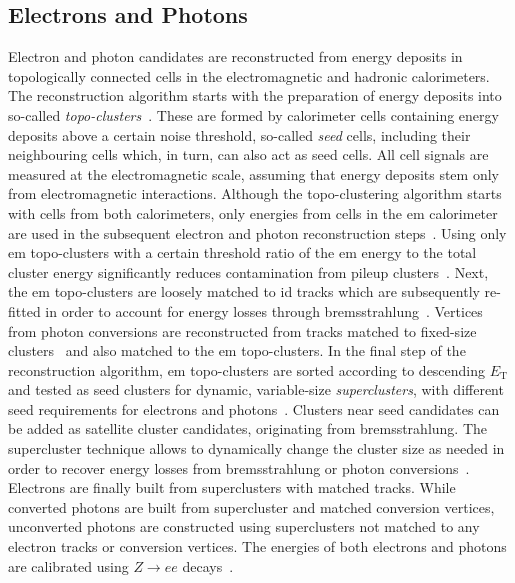 \subsection{Electrons and Photons}\label{sec:reco_electrons}

Electron and photon candidates are reconstructed from energy deposits in topologically connected cells in the electromagnetic and hadronic calorimeters. The reconstruction algorithm starts with the preparation of energy deposits into so-called \textit{topo-clusters}~\cite{PERF-2014-07}. These are formed by calorimeter cells containing energy deposits above a certain noise threshold, so-called \textit{seed} cells, including their neighbouring cells which, in turn, can also act as seed cells. All cell signals are measured at the electromagnetic scale, assuming that energy deposits stem only from electromagnetic interactions. Although the topo-clustering algorithm starts with cells from both calorimeters, only energies from cells in the \gls{em} calorimeter are used in the subsequent electron and photon reconstruction steps~\cite{EGAM-2018-01}. Using only \gls{em} topo-clusters with a certain threshold ratio of the \gls{em} energy to the total cluster energy significantly reduces contamination from pileup clusters~\cite{EGAM-2018-01}. Next, the \gls{em} topo-clusters are loosely matched to \gls{id} tracks which are subsequently re-fitted in order to account for energy losses through bremsstrahlung~\cite{EGAM-2018-01}. Vertices from photon conversions are reconstructed from tracks matched to fixed-size clusters~\cite{PERF-2017-02} and also matched to the \gls{em} topo-clusters. In the final step of the reconstruction algorithm, \gls{em} topo-clusters are sorted according to descending $E_{\mathrm{T}}$ and tested as seed clusters for dynamic, variable-size \textit{superclusters}, with different seed requirements for electrons and photons~\cite{EGAM-2018-01}. Clusters near seed candidates can be added as satellite cluster candidates, originating \eg from bremsstrahlung. The supercluster technique allows to dynamically change the cluster size as needed in order to recover energy losses from bremsstrahlung or photon conversions~\cite{EGAM-2018-01}. Electrons are finally built from superclusters with matched tracks. While converted photons are built from supercluster and matched conversion vertices, unconverted photons are constructed using superclusters not matched to any electron tracks or conversion vertices. The energies of both electrons and photons are calibrated using $Z\rightarrow ee$ decays~\cite{EGAM-2018-01}.

